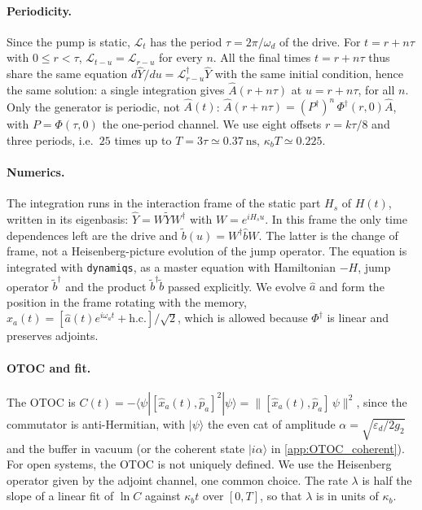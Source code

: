 \documentclass[aps,prx,reprint,floatfix,amsmath,amssymb,longbibliography]{revtex4-2}
\newcommand{\eps}{\varepsilon}
\newcommand{\ha}{\hat{a}}
\newcommand{\hb}{\hat{b}}
\begin{document}
\paragraph*{Periodicity.}
Since the pump is static, $\mathcal L_t$ has the period $\tau=2\pi/\omega_d$ of the drive. For $t=r+n\tau$ with $0\le r<\tau$, $\mathcal L_{t-u}=\mathcal L_{r-u}$ for every $n$. All the final times $t=r+n\tau$ thus share the same equation $d\hat Y/du=\mathcal L^\dagger_{r-u}\hat Y$ with the same initial condition, hence the same solution: a single integration gives $\hat A(r+n\tau)$ at $u=r+n\tau$, for all $n$. Only the generator is periodic, not $\hat A(t)$: $\hat A(r+n\tau)=(P^\dagger)^n\,\Phi^\dagger(r,0)\hat A$, with $P=\Phi(\tau,0)$ the one-period channel. We use eight offsets $r=k\tau/8$ and three periods, i.e.\ $25$ times up to $T=3\tau\simeq0.37~\mathrm{ns}$, $\kappa_bT\simeq0.225$.

\paragraph*{Numerics.}
The integration runs in the interaction frame of the static part $H_s$ of $H(t)$, written in its eigenbasis: $\hat Y=W\tilde Y W^\dagger$ with $W=e^{iH_su}$. In this frame the only time dependences left are the drive and $\tilde b(u)=W^\dagger\hb W$. The latter is the change of frame, not a Heisenberg-picture evolution of the jump operator. The equation is integrated with \texttt{dynamiqs}, as a master equation with Hamiltonian $-H$, jump operator $\tilde b^\dagger$ and the product $\tilde b^\dagger\tilde b$ passed explicitly. We evolve $\ha$ and form the position in the frame rotating with the memory, $\hat x_a(t)=[\ha(t)e^{i\omega_at}+\text{h.c.}]/\sqrt2$, which is allowed because $\Phi^\dagger$ is linear and preserves adjoints.

\paragraph*{OTOC and fit.}
The OTOC is $C(t)=-\langle\psi|[\hat x_a(t),\hat p_a]^2|\psi\rangle=\|[\hat x_a(t),\hat p_a]\,\psi\|^2$, since the commutator is anti-Hermitian, with $|\psi\rangle$ the even cat of amplitude $\alpha=\sqrt{\eps_d/2g_2}$ and the buffer in vacuum (or the coherent state $|i\alpha\rangle$ in \cref{app:OTOC_coherent}). For open systems, the OTOC is not uniquely defined. We use the Heisenberg operator given by the adjoint channel, one common choice. The rate $\lambda$ is half the slope of a linear fit of $\ln C$ against $\kappa_bt$ over $[0,T]$, so that $\lambda$ is in units of $\kappa_b$.
\end{document}
